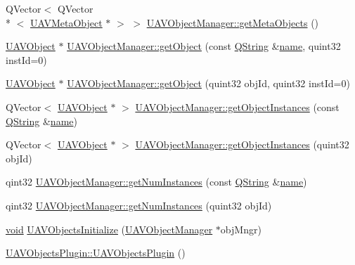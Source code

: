 \begin{DoxyCompactItemize}
\item 
Q\-Vector$<$ Q\-Vector\\*
$<$ \hyperlink{class_u_a_v_meta_object}{U\-A\-V\-Meta\-Object} $\ast$ $>$ $>$ \hyperlink{group___u_a_v_objects_plugin_ga8c25b065c3e4f456b2e3a7913f6d764f}{U\-A\-V\-Object\-Manager\-::get\-Meta\-Objects} ()
\item 
\hyperlink{class_u_a_v_object}{U\-A\-V\-Object} $\ast$ \hyperlink{group___u_a_v_objects_plugin_gada44cdbfa55a281b78d41abcc6834dc0}{U\-A\-V\-Object\-Manager\-::get\-Object} (const \hyperlink{group___u_a_v_objects_plugin_gab9d252f49c333c94a72f97ce3105a32d}{Q\-String} \&\hyperlink{glext_8h_ad977737dfc9a274a62741b9500c49a32}{name}, quint32 inst\-Id=0)
\item 
\hyperlink{class_u_a_v_object}{U\-A\-V\-Object} $\ast$ \hyperlink{group___u_a_v_objects_plugin_ga6d299736b20c625d2553f80123e71e7a}{U\-A\-V\-Object\-Manager\-::get\-Object} (quint32 obj\-Id, quint32 inst\-Id=0)
\item 
Q\-Vector$<$ \hyperlink{class_u_a_v_object}{U\-A\-V\-Object} $\ast$ $>$ \hyperlink{group___u_a_v_objects_plugin_ga575678dce0852cc3843610477ea587ff}{U\-A\-V\-Object\-Manager\-::get\-Object\-Instances} (const \hyperlink{group___u_a_v_objects_plugin_gab9d252f49c333c94a72f97ce3105a32d}{Q\-String} \&\hyperlink{glext_8h_ad977737dfc9a274a62741b9500c49a32}{name})
\item 
Q\-Vector$<$ \hyperlink{class_u_a_v_object}{U\-A\-V\-Object} $\ast$ $>$ \hyperlink{group___u_a_v_objects_plugin_gaa1134c6f38b27868f8f61c6e2aaae4f5}{U\-A\-V\-Object\-Manager\-::get\-Object\-Instances} (quint32 obj\-Id)
\item 
qint32 \hyperlink{group___u_a_v_objects_plugin_gab285ecd0299f701264d624cad6e51ef1}{U\-A\-V\-Object\-Manager\-::get\-Num\-Instances} (const \hyperlink{group___u_a_v_objects_plugin_gab9d252f49c333c94a72f97ce3105a32d}{Q\-String} \&\hyperlink{glext_8h_ad977737dfc9a274a62741b9500c49a32}{name})
\item 
qint32 \hyperlink{group___u_a_v_objects_plugin_ga22601fef22bd4c4ba1c48e07b70e8ddb}{U\-A\-V\-Object\-Manager\-::get\-Num\-Instances} (quint32 obj\-Id)
\item 
\hyperlink{group___u_a_v_objects_plugin_ga444cf2ff3f0ecbe028adce838d373f5c}{void} \hyperlink{group___u_a_v_objects_plugin_gaa5848573445b2e80691402f8bd9d2257}{U\-A\-V\-Objects\-Initialize} (\hyperlink{class_u_a_v_object_manager}{U\-A\-V\-Object\-Manager} $\ast$obj\-Mngr)
\item 
\hyperlink{group___u_a_v_objects_plugin_ga2345b6b23fc30557f18422344213a64d}{U\-A\-V\-Objects\-Plugin\-::\-U\-A\-V\-Objects\-Plugin} ()

\end{DoxyCompactItemize}
